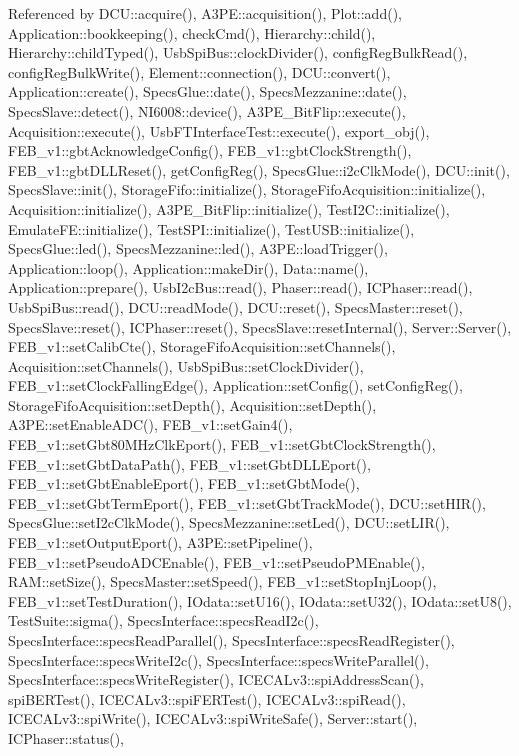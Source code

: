 Referenced by D\+C\+U\+::acquire(), A3\+P\+E\+::acquisition(), Plot\+::add(), Application\+::bookkeeping(), check\+Cmd(), Hierarchy\+::child(), Hierarchy\+::child\+Typed(), Usb\+Spi\+Bus\+::clock\+Divider(), config\+Reg\+Bulk\+Read(), config\+Reg\+Bulk\+Write(), Element\+::connection(), D\+C\+U\+::convert(), Application\+::create(), Specs\+Glue\+::date(), Specs\+Mezzanine\+::date(), Specs\+Slave\+::detect(), N\+I6008\+::device(), A3\+P\+E\+\_\+\+Bit\+Flip\+::execute(), Acquisition\+::execute(), Usb\+F\+T\+Interface\+Test\+::execute(), export\+\_\+obj(), F\+E\+B\+\_\+v1\+::gbt\+Acknowledge\+Config(), F\+E\+B\+\_\+v1\+::gbt\+Clock\+Strength(), F\+E\+B\+\_\+v1\+::gbt\+D\+L\+L\+Reset(), get\+Config\+Reg(), Specs\+Glue\+::i2c\+Clk\+Mode(), D\+C\+U\+::init(), Specs\+Slave\+::init(), Storage\+Fifo\+::initialize(), Storage\+Fifo\+Acquisition\+::initialize(), Acquisition\+::initialize(), A3\+P\+E\+\_\+\+Bit\+Flip\+::initialize(), Test\+I2\+C\+::initialize(), Emulate\+F\+E\+::initialize(), Test\+S\+P\+I\+::initialize(), Test\+U\+S\+B\+::initialize(), Specs\+Glue\+::led(), Specs\+Mezzanine\+::led(), A3\+P\+E\+::load\+Trigger(), Application\+::loop(), Application\+::make\+Dir(), Data\+::name(), Application\+::prepare(), Usb\+I2c\+Bus\+::read(), Phaser\+::read(), I\+C\+Phaser\+::read(), Usb\+Spi\+Bus\+::read(), D\+C\+U\+::read\+Mode(), D\+C\+U\+::reset(), Specs\+Master\+::reset(), Specs\+Slave\+::reset(), I\+C\+Phaser\+::reset(), Specs\+Slave\+::reset\+Internal(), Server\+::\+Server(), F\+E\+B\+\_\+v1\+::set\+Calib\+Cte(), Storage\+Fifo\+Acquisition\+::set\+Channels(), Acquisition\+::set\+Channels(), Usb\+Spi\+Bus\+::set\+Clock\+Divider(), F\+E\+B\+\_\+v1\+::set\+Clock\+Falling\+Edge(), Application\+::set\+Config(), set\+Config\+Reg(), Storage\+Fifo\+Acquisition\+::set\+Depth(), Acquisition\+::set\+Depth(), A3\+P\+E\+::set\+Enable\+A\+D\+C(), F\+E\+B\+\_\+v1\+::set\+Gain4(), F\+E\+B\+\_\+v1\+::set\+Gbt80\+M\+Hz\+Clk\+Eport(), F\+E\+B\+\_\+v1\+::set\+Gbt\+Clock\+Strength(), F\+E\+B\+\_\+v1\+::set\+Gbt\+Data\+Path(), F\+E\+B\+\_\+v1\+::set\+Gbt\+D\+L\+L\+Eport(), F\+E\+B\+\_\+v1\+::set\+Gbt\+Enable\+Eport(), F\+E\+B\+\_\+v1\+::set\+Gbt\+Mode(), F\+E\+B\+\_\+v1\+::set\+Gbt\+Term\+Eport(), F\+E\+B\+\_\+v1\+::set\+Gbt\+Track\+Mode(), D\+C\+U\+::set\+H\+I\+R(), Specs\+Glue\+::set\+I2c\+Clk\+Mode(), Specs\+Mezzanine\+::set\+Led(), D\+C\+U\+::set\+L\+I\+R(), F\+E\+B\+\_\+v1\+::set\+Output\+Eport(), A3\+P\+E\+::set\+Pipeline(), F\+E\+B\+\_\+v1\+::set\+Pseudo\+A\+D\+C\+Enable(), F\+E\+B\+\_\+v1\+::set\+Pseudo\+P\+M\+Enable(), R\+A\+M\+::set\+Size(), Specs\+Master\+::set\+Speed(), F\+E\+B\+\_\+v1\+::set\+Stop\+Inj\+Loop(), F\+E\+B\+\_\+v1\+::set\+Test\+Duration(), I\+Odata\+::set\+U16(), I\+Odata\+::set\+U32(), I\+Odata\+::set\+U8(), Test\+Suite\+::sigma(), Specs\+Interface\+::specs\+Read\+I2c(), Specs\+Interface\+::specs\+Read\+Parallel(), Specs\+Interface\+::specs\+Read\+Register(), Specs\+Interface\+::specs\+Write\+I2c(), Specs\+Interface\+::specs\+Write\+Parallel(), Specs\+Interface\+::specs\+Write\+Register(), I\+C\+E\+C\+A\+Lv3\+::spi\+Address\+Scan(), spi\+B\+E\+R\+Test(), I\+C\+E\+C\+A\+Lv3\+::spi\+F\+E\+R\+Test(), I\+C\+E\+C\+A\+Lv3\+::spi\+Read(), I\+C\+E\+C\+A\+Lv3\+::spi\+Write(), I\+C\+E\+C\+A\+Lv3\+::spi\+Write\+Safe(), Server\+::start(), I\+C\+Phaser\+::status(), 